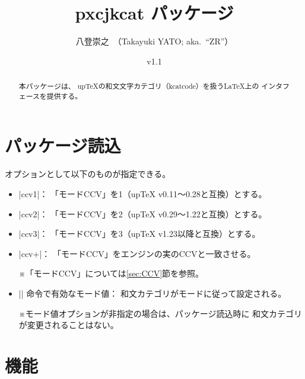 \documentclass[uplatex,dvipdfmx,a4paper]{jsarticle}
\newenvironment{myverbatim}
  {\quote\small\verbatim}
  {\endverbatim\endquote}
\newcommand{\PkgVersion}{1.1}
\newcommand{\PkgDate}{2018/04/01}
\newcommand{\Pkg}[1]{\textsf{#1}}
\newcommand{\Note}{\par\noindent ※}
\newcommand{\Means}{：\quad}
\newcommand{\strong}{\textsf}
\providecommand{\pTeX}{p\TeX}
\providecommand{\upTeX}{u\pTeX}
\begin{document}
\title{\Pkg{pxcjkcat} パッケージ}
\author{八登崇之\ （Takayuki YATO; aka.~``ZR''）}
\date{v\PkgVersion\quad[\PkgDate]}
\maketitle

\begin{abstract}
本パッケージは、
{\upTeX}の和文文字カテゴリ（kcatcode）を扱う{\LaTeX}上の
インタフェースを提供する。
\end{abstract}

\tableofcontents

\section{パッケージ読込}
\label{sec:Loading}

\begin{myverbatim}
\usepackage[<オプション>]{pxcjkcat}
\end{myverbatim}

オプションとして以下のものが指定できる。

\begin{itemize}
\item |ccv1|\Means
  「モードCCV」を1（{\upTeX} v0.11～0.28と互換）とする。
\item |ccv2|\Means
  「モードCCV」を2（{\upTeX} v0.29～1.22と互換）とする。
\item |ccv3|\Means
  「モードCCV」を3（{\upTeX} v1.23以降と互換）とする。
\item |ccv+|\Means
  「モードCCV」をエンジンの実のCCVと一致させる。
  \Note 「モードCCV」については\ref{sec:CCV}節を参照。
\item |\cjkcategorymode| \strong{命令で有効なモード値}\Means
  和文カテゴリがモードに従って設定される。
  \Note モード値オプションが非指定の場合は、パッケージ読込時に
  和文カテゴリが変更されることはない。
\end{itemize}

\section{機能}
\label{sec:Function}
\end{document}
